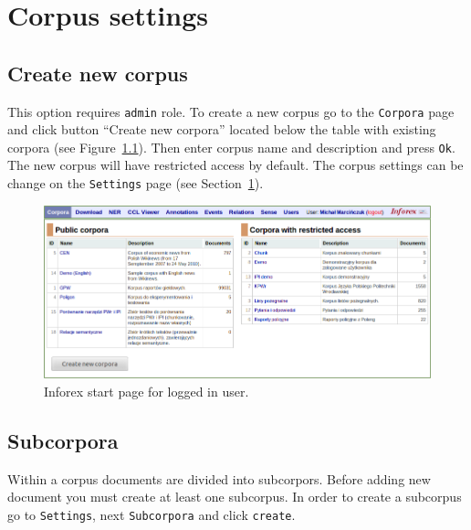 \documentclass[a4paper,10pt,oneside]{scrbook}
\begin{document}
\chapter{Corpus settings}
\label{sec:corpus-settings}

\section{Create new corpus}

This option requires \verb|admin| role. To create a new corpus go to the \verb|Corpora| page and click button ``Create new corpora'' located below the table with existing corpora (see Figure~\ref{fig:inforex-start-page}). Then enter corpus name and description and press \verb|Ok|. The new corpus will have restricted access by default. The corpus settings can be change on the \verb|Settings| page (see Section~\ref{sec:corpus-settings}).

\begin{figure}[h]
\centering
\includegraphics{images/inforex-corpora-new.png}
\caption{Inforex start page for logged in user.}
\label{fig:inforex-start-page}
\end{figure}

\section{Subcorpora}
\label{sec:corpus-subcorpora}

Within a corpus documents are divided into subcorpors. Before adding new document you must create at least one subcorpus. In order to create a subcorpus go to \verb|Settings|, next \verb|Subcorpora| and click \verb|create|.
\end{document}
